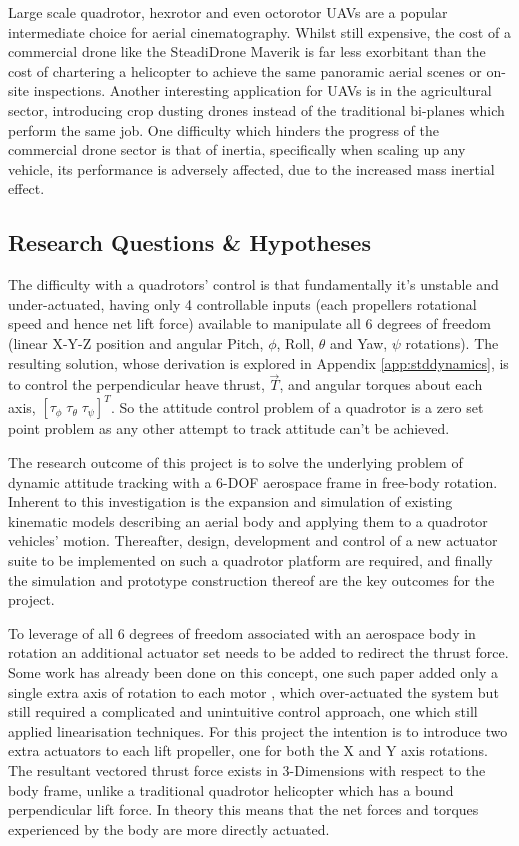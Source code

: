 \par
Large scale quadrotor, hexrotor and even octorotor UAVs are a popular intermediate choice for aerial cinematography.  Whilst still expensive, the cost of a commercial drone like the SteadiDrone Maverik \cite{steadidrone} is far less exorbitant than the cost of chartering a helicopter to achieve the same panoramic aerial scenes or on-site inspections. Another interesting application for UAVs is in the agricultural sector, introducing crop dusting drones instead of the traditional bi-planes which perform the same job. One difficulty which hinders the progress of the commercial drone sector is that of inertia, specifically when scaling up any vehicle, its performance is adversely affected, due to the increased mass inertial effect.
\subsection{Research Questions \& Hypotheses}
\label{subsec:ch1.foreward.hypotheses}
The difficulty with a quadrotors' control is that fundamentally it's unstable and under-actuated, having only 4 controllable inputs (each propellers rotational speed and hence net lift force) available to manipulate all 6 degrees of freedom (linear X-Y-Z position and angular Pitch, $\phi$, Roll, $\theta$ and Yaw, $\psi$ rotations). The resulting solution, whose derivation is explored in Appendix \ref{app:stddynamics}, is to control the perpendicular heave thrust, $\vec{T}$, and angular torques about each axis, $[\tau_\phi\;\tau_\theta\;\tau_\psi]^T$. So the attitude control problem of a quadrotor is a zero set point problem as any other attempt to track attitude can't be achieved.
\par
The research outcome of this project is to solve the underlying problem of dynamic attitude tracking with a 6-DOF aerospace frame in free-body rotation. Inherent to this investigation is the expansion and simulation of existing kinematic models describing an aerial body and applying them to a quadrotor vehicles' motion. Thereafter, design, development and control of a new actuator suite to be implemented on such a quadrotor platform are required, and finally the simulation and prototype construction thereof are the key outcomes for the project.
\par
To leverage of all 6 degrees of freedom associated with an aerospace body in rotation an additional actuator set needs to be added to redirect the thrust force. Some work has already been done on this concept, one such paper added only a single extra axis of rotation to each motor \cite{tiltpropellerflight} , which over-actuated the system but still required a complicated and unintuitive control approach, one which still applied linearisation techniques. For this project the intention is to introduce two extra actuators to each lift propeller, one for both the X and Y axis rotations. The resultant vectored thrust force exists in 3-Dimensions with respect to the body frame, unlike a traditional quadrotor helicopter which has a bound perpendicular lift force. In theory this means that the net forces and torques experienced by the body are more directly actuated.
